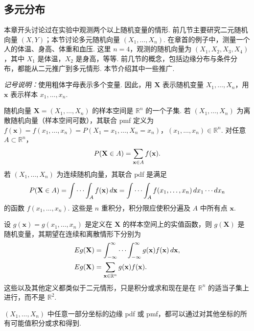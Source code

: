 \subsection{多元分布}\label{sec:4.6}
本章开头讨论过在实验中观测两个以上随机变量的情形. 前几节主要研究二元随机向量 $(X,Y)$；本节讨论多元随机向量 $(X_1,\ldots,X_n)$. 在章首的例子中，测量一个人的体温、身高、体重和血压. 这里 $n=4$，观测的随机向量为 $(X_1,X_2,X_3,X_4)$，其中 $X_1$ 是体温，$X_2$ 是身高，等等. 前几节的概念，包括边缘分布与条件分布，都能从二元推广到多元情形. 本节介绍其中一些推广.

\textit{记号说明：}使用粗体字母表示多个变量. 因此，用 $\mathbf X$ 表示随机变量 $X_1,\ldots,X_n$，用 $\mathbf x$ 表示样本 $x_1,\ldots,x_n$.

随机向量 $\mathbf X=(X_1,\ldots,X_n)$ 的样本空间是 $\mathbb R^n$ 的一个子集. 若 $(X_1,\ldots,X_n)$ 为离散随机向量（样本空间可数），其联合 pmf 定义为 $f(\mathbf x)=f(x_1,\ldots,x_n)=P(X_1=x_1,\ldots,X_n=x_n)$，$(x_1,\ldots,x_n)\in\mathbb R^n$. 对任意 $A\subset\mathbb R^n$，
\begin{equation}\label{eq:4.6.1}\index{SI0853@联合}
P(\mathbf X\in A)=\sum_{\mathbf x\in A}f(\mathbf x).
\end{equation}
若 $(X_1,\ldots,X_n)$ 为连续随机向量，其联合 pdf 是满足
\begin{equation}\label{eq:4.6.2}\index{SI0833@联合}
P(\mathbf X\in A)=\int\cdots\int_A f(\mathbf x)\,d\mathbf x
=\int\cdots\int_A f(x_1,\ldots,x_n)\,dx_1\cdots dx_n
\end{equation}
的函数 $f(x_1,\ldots,x_n)$. 这些是 $n$ 重积分，积分限应使积分遍及 $A$ 中所有点 $\mathbf x$.

设 $g(\mathbf x)=g(x_1,\ldots,x_n)$ 是定义在 $\mathbf X$ 的样本空间上的实值函数，则 $g(\mathbf X)$ 是随机变量，其期望在连续和离散情形下分别为
\begin{equation}\label{eq:4.6.3}\index{SI0429@联合}
\begin{aligned}
Eg(\mathbf X)&=\int_{-\infty}^{\infty}\cdots\int_{-\infty}^{\infty}g(\mathbf x)f(\mathbf x)\,d\mathbf x,\\
Eg(\mathbf X)&=\sum_{\mathbf x\in\mathbb R^n}g(\mathbf x)f(\mathbf x).
\end{aligned}
\end{equation}
这些以及其他定义都类似于二元情形，只是积分或求和现在是在 $\mathbb R^n$ 的适当子集上进行，而不是 $\mathbb R^2$.

$(X_1,\ldots,X_n)$ 中任意一部分坐标的边缘 pdf 或 pmf，都可以通过对其他坐标的所有可能值积分或求和得到.

